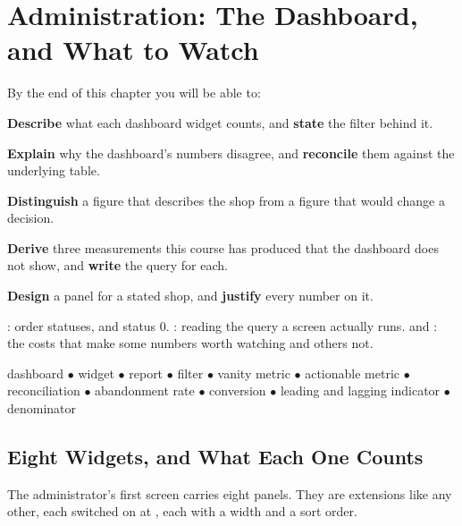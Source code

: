 \chapter{Administration: The Dashboard, and What to Watch}\label{ch:dashboard}

\begin{outcomes}
By the end of this chapter you will be able to:
\begin{tight}
  \item \textbf{Describe} what each dashboard widget counts, and \textbf{state}
        the filter behind it.
  \item \textbf{Explain} why the dashboard's numbers disagree, and
        \textbf{reconcile} them against the underlying table.
  \item \textbf{Distinguish} a figure that describes the shop from a figure
        that would change a decision.
  \item \textbf{Derive} three measurements this course has produced that the
        dashboard does not show, and \textbf{write} the query for each.
  \item \textbf{Design} a panel for a stated shop, and \textbf{justify} every
        number on it.
\end{tight}
\end{outcomes}

\begin{prereq}
: order statuses, and status 0. : reading the
query a screen actually runs.  and : the costs
that make some numbers worth watching and others not.
\end{prereq}

\begin{keyterms}
dashboard $\bullet$ widget $\bullet$ report $\bullet$ filter $\bullet$ vanity
metric $\bullet$ actionable metric $\bullet$ reconciliation $\bullet$
abandonment rate $\bullet$ conversion $\bullet$ leading and lagging indicator
$\bullet$ denominator
\end{keyterms}

\section{Eight Widgets, and What Each One Counts}

The administrator's first screen carries eight panels. They are extensions like
any other, each switched on at ,
each with a width and a sort order.

